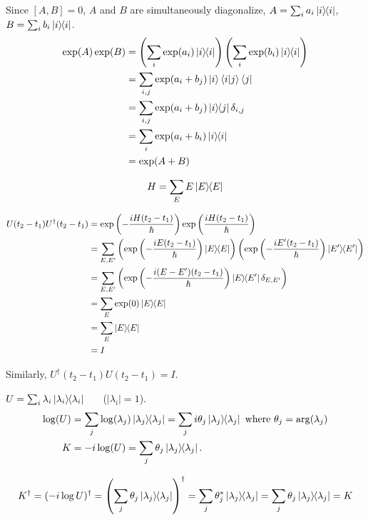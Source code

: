 Since $[A, B] = 0$, $A$ and $B$ are simultaneously diagonalize, $A = \sum_i a_i \ket{i}\hspace{-1mm} \bra{i}$, $B = \sum_i b_i \ket{i}\hspace{-1mm} \bra{i}$.
\begin{align*}
	\exp (A) \exp (B) &= \left(\sum_i \exp (a_i) \ket{i}\hspace{-1mm} \bra{i}\right) \left(\sum_i \exp (b_i) \ket{i}\hspace{-1mm} \bra{i}\right) \\
		&= \sum_{i,j} \exp (a_i + b_j) \ket{i} \braket{i | j} \bra{j}\\
		&= \sum_{i,j} \exp (a_i + b_j) \ket{i}\hspace{-1mm} \bra{j} \delta_{i, j}\\
		&= \sum_i \exp (a_i +  b_i) \ket{i}\hspace{-1mm} \bra{i}\\
		&= \exp (A+B)
\end{align*}


\begin{align*}
	H = \sum_E E \ket{E}\hspace{-1mm} \bra{E}
\end{align*}

\begin{align*}
	U(t_2 - t_1) U^\dagger (t_2 - t_1) &= \exp \left( - \frac{iH(t_2 - t_1)}{\hbar} \right)  \exp \left(  \frac{iH(t_2 - t_1)}{\hbar} \right)\\
		&= \sum_{E, E'} \left(\exp \left(- \frac{iE(t_2 - t_1)}{\hbar} \right) \ket{E}\hspace{-1mm} \bra{E} \right)
										\left(\exp \left(- \frac{iE'(t_2 - t_1)}{\hbar} \right) \ket{E'}\hspace{-1mm} \bra{E'} \right)\\
		&= \sum_{E, E'} \left(\exp \left(- \frac{i(E-E')(t_2 - t_1)}{\hbar} \right) \ket{E}\hspace{-1mm} \bra{E'} \delta_{E,E'} \right) \\
		&= \sum_E \exp(0) \ket{E}\hspace{-1mm} \bra{E}\\
		&= \sum_E \ket{E}\hspace{-1mm} \bra{E}\\
		&= I
\end{align*}

Similarly, $U^\dagger (t_2 - t_1) U (t_2 - t_1) = I$.




$U = \sum_i \lambda_i \ket{\lambda_i}\hspace{-1mm} \bra{\lambda_i}$~~~ ($|\lambda_i| = 1$).
\begin{align*}
	\log (U) &= \sum_j \log (\lambda_j) \ket{\lambda_j}\hspace{-1mm} \bra{\lambda_j} = \sum_j i \theta_j  \ket{\lambda_j}\hspace{-1mm} \bra{\lambda_j} \text{ where } \theta_j = \arg (\lambda_j)\\
	K &= - i \log(U) = \sum_j \theta_j \ket{\lambda_j}\hspace{-1mm} \bra{\lambda_j}.
\end{align*}

\begin{align*}
	K^\dagger = (-i \log U)^\dagger = \left(\sum_j \theta_j \ket{\lambda_j}\hspace{-1mm} \bra{\lambda_j}\right)^\dagger
	= \sum_j \theta_j^* \ket{\lambda_j}\hspace{-1mm} \bra{\lambda_j} = \sum_j \theta_j \ket{\lambda_j}\hspace{-1mm} \bra{\lambda_j} = K
\end{align*}




